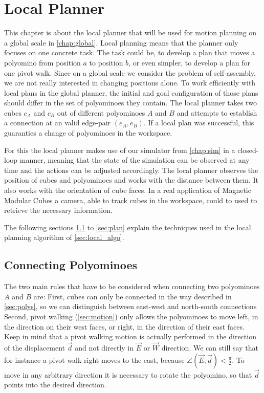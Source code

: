 \chapter{Local Planner}
\label{chap:local}

This chapter is about the local planner that will be used for motion planning on a global scale in \autoref{chap:global}.
Local planning means that the planner only focuses on one concrete task.
The task could be, to develop a plan that moves a polyomino from position $a$ to position $b$, or even simpler, to develop a plan for one pivot walk.
Since on a global scale we consider the problem of self-assembly, we are not really interested in changing positions alone.
To work efficiently with local plans in the global planner, the initial and goal configuration of those plans should differ in the set of polyominoes they contain.
The local planner takes two cubes $c_A$ and $c_B$ out of different polyominoes $A$ and $B$ and attempts to establish a connection at an valid edge-pair $(e_A, e_B)$.
If a local plan was successful, this guaranties a change of polyominoes in the workspace.

For this the local planner makes use of our simulator from \autoref{chap:sim} in a closed-loop manner, meaning that the state of the simulation can be observed at any time and the actions can be adjusted accordingly.
The local planner observes the position of cubes and polyominoes and works with the distance between them.
It also works with the orientation of cube faces.
In a real application of Magnetic Modular Cubes a camera, able to track cubes in the workspace, could to used to retrieve the necessary information. 

The following sections \ref{sec:connect} to \ref{sec:plan} explain the techniques used in the local planning algorithm of \autoref{sec:local_algo}.

\section{Connecting Polyominoes}
\label{sec:connect}

The two main rules that have to be considered when connecting two polyominoes $A$ and $B$ are:
First, cubes can only be connected in the way described in \autoref{sec:polys}, so we can distinguish between east-west and north-south connections
Second, pivot walking (\autoref{sec:motion}) only allows the polyominoes to move left, in the direction on their west faces, or right, in the direction of their east faces.
Keep in mind that a pivot walking motion is actually performed in the direction of the displacement $\vec{d}$ and not directly in $\vec{E}$ or $\vec{W}$ direction.
We can still say that for instance a pivot walk right moves to the east, because $\angle \left( \vec{E}, \vec{d} \right) < \frac{\pi}{2}$.
To move in any arbitrary direction it is necessary to rotate the polyomino, so that $\vec{d}$ points into the desired direction.

